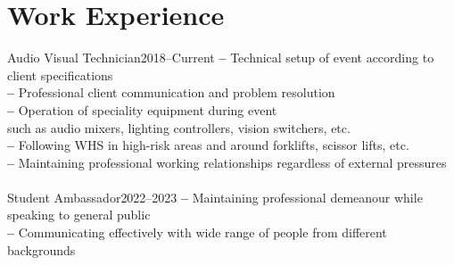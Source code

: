 \section{Work Experience}
    {Audio Visual Technician}{2018--Current}{
      \textbf{--} Technical setup of event according to client specifications \\
      \textbf{--} Professional client communication and problem resolution \\
      \textbf{--} Operation of speciality equipment during event \\
        \hspace{18pt} such as audio mixers, lighting controllers, vision switchers, etc. \\
      \textbf{--} Following WHS in high-risk areas and around forklifts, scissor lifts, etc. \\
      \textbf{--} Maintaining professional working relationships regardless of external pressures \\
    }
\\
    {Student Ambassador}{2022--2023}{
      \textbf{--} Maintaining professional demeanour while speaking to general public \\
      \textbf{--} Communicating effectively with wide range of people from different backgrounds \\
    }
